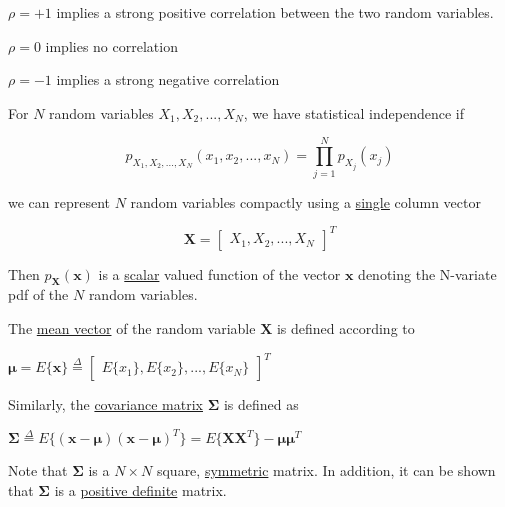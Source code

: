 \documentclass[fleqn]{article}
\begin{document}
	$\rho = +1$ implies a strong positive correlation between the two random variables.
	
	$\rho = 0$ implies no correlation
	
	$\rho = -1$ implies a strong negative correlation	
	
	For $N$ random variables $X_1, X_2,...,X_N$, we have statistical independence if
	
	\begin{equation*}
		p_{X_1, X_2,...,X_N}(x_1,x_2,...,x_N) = \prod_{j=1}^{N}p_{X_j}(x_j)
	\end{equation*}
	
	we can represent $N$ random variables compactly using a \underline{single} column vector
	
	\begin{equation*}
		\mathbf{X} = \begin{bmatrix} X_1, X_2,... ,X_N\end{bmatrix}^T
	\end{equation*}
	
	Then $p_\mathbf{X}(\mathbf{x})$ is a \underline{scalar} valued function of the vector $\mathbf{x}$ denoting the N-variate pdf of the $N$ random variables.
	
	The \underline{mean vector} of the random variable $\mathbf{X}$ is defined according to
	
	$\boldsymbol{\mu} = E\{\mathbf{x}\} \overset{\Delta}{=} \begin{bmatrix}E\{x_1\},E\{x_2\},...,E\{x_N\}\end{bmatrix}^T$
	
	Similarly, the \underline{covariance matrix} $\mathbf{\Sigma}$ is defined as
	
	$\mathbf{\Sigma} \overset{\Delta}{=} E\{(\mathbf{x} - \boldsymbol{\mu})(\mathbf{x} - \boldsymbol{\mu})^T\} = E\{\mathbf{X}\mathbf{X}^T\} - \boldsymbol{\mu}\boldsymbol{\mu}^T$
	
	Note that $\mathbf{\Sigma}$ is a $N \times N$ square, \underline{symmetric} matrix. In addition, it can be shown that $\mathbf{\Sigma}$ is a \underline{positive definite} matrix.
\end{document}
